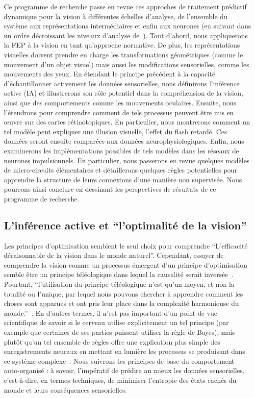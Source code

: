 Ce programme de recherche passe en revue ces approches de traitement prédictif
dynamique pour la vision à différentes échelles d'analyse, de l'ensemble
du système aux représentations intermédiaires et enfin aux neurones (en
suivant dans un ordre décroissant les niveaux d'analyse de~\citet{Marr83}).
Tout d'abord, nous appliquerons la FEP à la vision en tant qu'approche
normative. De plus, les représentations visuelles doivent prendre en
charge les transformations géométriques (comme le mouvement d'un objet
visuel) mais aussi les modifications sensorielles, comme les mouvements
des yeux. En étendant le principe précédent à la capacité
d'échantillonner activement les données sensorielles, nous définirons
l'inférence active (IA) et illustrerons son rôle potentiel dans la
compréhension de la vision, ainsi que des comportements comme les
mouvements oculaires. Ensuite, nous l'étendrons pour
comprendre comment de tels processus peuvent être mis en œuvre sur des
cartes rétinotopiques. En particulier, nous montrerons
comment un tel modèle peut expliquer une illusion visuelle, l'effet du flash retardé. %
Ces données seront ensuite comparées aux données
neurophysiologiques. Enfin, nous examinerons les implémentations
possibles de tels modèles dans les réseaux de neurones impulsionnels. En particulier, nous passerons en revue quelques modèles de
micro-circuits élémentaires et détaillerons quelques règles potentielles
pour apprendre la structure de leurs connexions d'une manière non
supervisée. Nous pourrons ainsi conclure en dessinant les perspectives de résultats de ce programme de recherche.

\subsection{L'inférence active et ``l'optimalité de la vision''}
\label{sec:ai}
Les principes d'optimisation semblent le seul choix pour comprendre
``L'efficacité déraisonnable de la vision dans le monde naturel''.
Cependant, essayer de comprendre la vision comme un processus émergent
d'un principe d'optimisation semble être un principe téléologique dans
lequel la causalité serait inversée~\citep{Turkheimer19}. Pourtant,
``l'utilisation du principe téléologique n'est qu'un moyen, et non la
totalité ou l'unique, par lequel nous pouvons chercher à apprendre
comment les choses sont apparues et ont pris leur place dans la
complexité harmonieuse du monde.''~\citep[chap. 1, ma traduction]{DArcy-Thompson17}. En
d'autres termes, il n'est pas important d'un point de vue scientifique
de savoir si le cerveau utilise explicitement un tel principe (par
exemple que certaines de ses parties puissent utiliser la règle de
Bayes), mais plutôt qu'un tel ensemble de règles offre une explication
plus simple des enregistrements neuraux en mettant en lumière les
processus se produisant dans ce système complexe~\citep{Varoquaux19}.
Nous suivrons les principes de base du comportement auto-organisé
: à savoir, l'impératif de prédire au mieux les données sensorielles,
c'est-à-dire, en termes techniques, de minimiser l'entropie des états
cachés du monde et leurs conséquences sensorielles.

